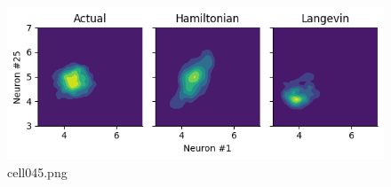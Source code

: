 \begin{figure}[ht]
	\centering
	\includegraphics[scale=0.8, max width=\linewidth]{./fig/bayesian-brain/neural-sampling/cell045.png}
	\caption{cell045.png}
	\label{cell045.png}
\end{figure}